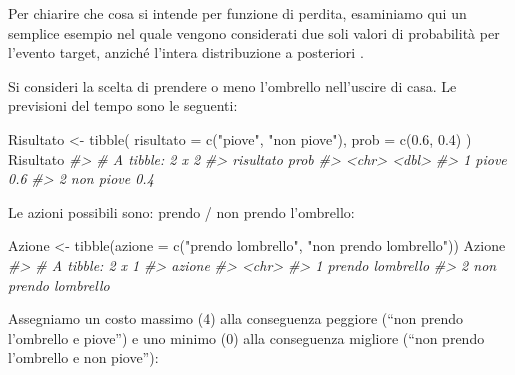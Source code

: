 \documentclass[
  11pt,
]{krantz}
\makeatletter
\newenvironment{Shaded}{\begin{snugshade}}{\end{snugshade}}
\newcommand{\AttributeTok}[1]{\textcolor[rgb]{0.61,0.61,0.61}{#1}}
\newcommand{\CommentTok}[1]{\textcolor[rgb]{0.37,0.37,0.37}{\textit{#1}}}
\newcommand{\FloatTok}[1]{\textcolor[rgb]{0.06,0.06,0.06}{#1}}
\newcommand{\FunctionTok}[1]{\textcolor[rgb]{0,0,0}{#1}}
\newcommand{\NormalTok}[1]{#1}
\newcommand{\OtherTok}[1]{\textcolor[rgb]{0.37,0.37,0.37}{#1}}
\newcommand{\StringTok}[1]{\textcolor[rgb]{0.5,0.5,0.5}{#1}}
\newenvironment{kframe}{%
\medskip{}
\setlength{\fboxsep}{.8em}
 \def\at@end@of@kframe{}%
 \ifinner\ifhmode%
  \def\at@end@of@kframe{\end{minipage}}%
  \begin{minipage}{\columnwidth}%
 \fi\fi%
 \def\FrameCommand##1{\hskip\@totalleftmargin \hskip-\fboxsep
 \colorbox{shadecolor}{##1}\hskip-\fboxsep
     \hskip-\linewidth \hskip-\@totalleftmargin \hskip\columnwidth}%
 \MakeFramed {\advance\hsize-\width
   \@totalleftmargin\z@ \linewidth\hsize
   \@setminipage}}%
 {\par\unskip\endMakeFramed%
 \at@end@of@kframe}
\renewenvironment{Shaded}{\begin{kframe}}{\end{kframe}}
\theoremstyle{definition}
\theoremstyle{definition}
\theoremstyle{definition}
\theoremstyle{definition}
\theoremstyle{remark}
\makeatother
\begin{document}
Per chiarire che cosa si intende per funzione di perdita, esaminiamo qui un semplice esempio nel quale vengono considerati due soli valori di probabilità per l'evento target, anziché l'intera distribuzione a posteriori \citep[il codice è ricavato da][]{schmettow2021new}.

Si consideri la scelta di prendere o meno l'ombrello nell'uscire di casa. Le previsioni del tempo sono le seguenti:

\begin{Shaded}
\begin{Highlighting}[]
\NormalTok{Risultato }\OtherTok{\textless{}{-}}
  \FunctionTok{tibble}\NormalTok{(}
    \AttributeTok{risultato =} \FunctionTok{c}\NormalTok{(}\StringTok{"piove"}\NormalTok{, }\StringTok{"non piove"}\NormalTok{),}
    \AttributeTok{prob =} \FunctionTok{c}\NormalTok{(}\FloatTok{0.6}\NormalTok{, }\FloatTok{0.4}\NormalTok{)}
\NormalTok{  )}
\NormalTok{Risultato}
\CommentTok{\#\textgreater{} \# A tibble: 2 x 2}
\CommentTok{\#\textgreater{}   risultato  prob}
\CommentTok{\#\textgreater{}   \textless{}chr\textgreater{}     \textless{}dbl\textgreater{}}
\CommentTok{\#\textgreater{} 1 piove       0.6}
\CommentTok{\#\textgreater{} 2 non piove   0.4}
\end{Highlighting}
\end{Shaded}

Le azioni possibili sono: prendo / non prendo l'ombrello:

\begin{Shaded}
\begin{Highlighting}[]
\NormalTok{Azione }\OtherTok{\textless{}{-}}
  \FunctionTok{tibble}\NormalTok{(}\AttributeTok{azione =} \FunctionTok{c}\NormalTok{(}\StringTok{"prendo l\textquotesingle{}ombrello"}\NormalTok{, }\StringTok{"non prendo l\textquotesingle{}ombrello"}\NormalTok{))}
\NormalTok{Azione}
\CommentTok{\#\textgreater{} \# A tibble: 2 x 1}
\CommentTok{\#\textgreater{}   azione               }
\CommentTok{\#\textgreater{}   \textless{}chr\textgreater{}                }
\CommentTok{\#\textgreater{} 1 prendo l\textquotesingle{}ombrello    }
\CommentTok{\#\textgreater{} 2 non prendo l\textquotesingle{}ombrello}
\end{Highlighting}
\end{Shaded}

Assegniamo un costo massimo (4) alla conseguenza peggiore (``non prendo l'ombrello e piove'') e uno minimo (0) alla conseguenza migliore (``non prendo l'ombrello e non piove''):
\end{document}
